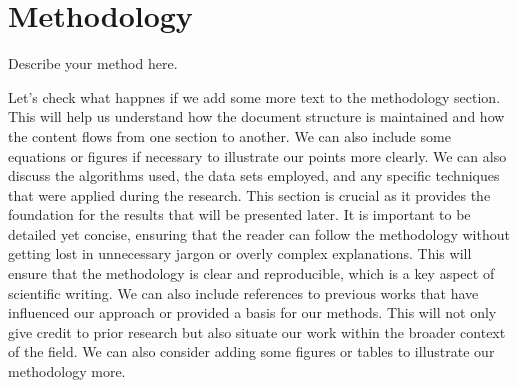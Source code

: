 \section{Methodology}
Describe your method here.

Let's check what happnes if we add some more text to the methodology section. This will help us understand how the document structure is maintained and how the content flows from one section to another. We can also include some equations or figures if necessary to illustrate our points more clearly.
We can also discuss the algorithms used, the data sets employed, and any specific techniques that were applied during the research. This section is crucial as it provides the foundation for the results that will be presented later. It is important to be detailed yet concise, ensuring that the reader can follow the methodology without getting lost in unnecessary jargon or overly complex explanations.
This will ensure that the methodology is clear and reproducible, which is a key aspect of scientific writing. We can also include references to previous works that have influenced our approach or provided a basis for our methods. This will not only give credit to prior research but also situate our work within the broader context of the field.
We can also consider adding some figures or tables to illustrate our methodology more.
